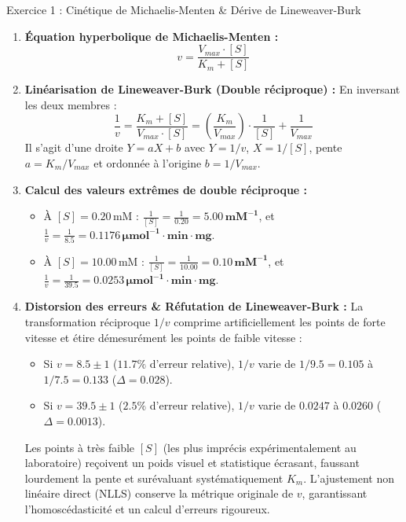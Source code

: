 \documentclass[11pt,a4paper]{article}
\begin{document}

\begin{solutionbox}{Exercice 1 : Cinétique de Michaelis-Menten \& Dérive de Lineweaver-Burk}
\begin{enumerate}[label=\textbf{\alph*.}]
  \item \textbf{Équation hyperbolique de Michaelis-Menten :}
  \begin{equation*}
    v = \frac{V_{max} \cdot [S]}{K_m + [S]}
  \end{equation*}

  \item \textbf{Linéarisation de Lineweaver-Burk (Double réciproque) :}
  En inversant les deux membres :
  \begin{equation*}
    \frac{1}{v} = \frac{K_m + [S]}{V_{max} \cdot [S]} = \left(\frac{K_m}{V_{max}}\right) \cdot \frac{1}{[S]} + \frac{1}{V_{max}}
  \end{equation*}
  Il s'agit d'une droite $Y = a X + b$ avec $Y = 1/v$, $X = 1/[S]$, pente $a = K_m/V_{max}$ et ordonnée à l'origine $b = 1/V_{max}$.

  \item \textbf{Calcul des valeurs extrêmes de double réciproque :}
  \begin{itemize}
    \item À $[S] = 0.20\,\text{mM}$ : $\frac{1}{[S]} = \frac{1}{0.20} = \mathbf{5.00\,\text{mM}^{-1}}$, et $\frac{1}{v} = \frac{1}{8.5} = \mathbf{0.1176\,\mu\text{mol}^{-1}\cdot\text{min}\cdot\text{mg}}$.
    \item À $[S] = 10.00\,\text{mM}$ : $\frac{1}{[S]} = \frac{1}{10.00} = \mathbf{0.10\,\text{mM}^{-1}}$, et $\frac{1}{v} = \frac{1}{39.5} = \mathbf{0.0253\,\mu\text{mol}^{-1}\cdot\text{min}\cdot\text{mg}}$.
  \end{itemize}

  \item \textbf{Distorsion des erreurs \& Réfutation de Lineweaver-Burk :}
  La transformation réciproque $1/v$ comprime artificiellement les points de forte vitesse et étire démesurément les points de faible vitesse :
  \begin{itemize}
    \item Si $v = 8.5 \pm 1$ ($11.7\%$ d'erreur relative), $1/v$ varie de $1/9.5 = 0.105$ à $1/7.5 = 0.133$ ($\Delta = 0.028$).
    \item Si $v = 39.5 \pm 1$ ($2.5\%$ d'erreur relative), $1/v$ varie de $0.0247$ à $0.0260$ ($\Delta = 0.0013$).
  \end{itemize}
  Les points à très faible $[S]$ (les plus imprécis expérimentalement au laboratoire) reçoivent un poids visuel et statistique écrasant, faussant lourdement la pente et surévaluant systématiquement $K_m$. L'ajustement non linéaire direct (NLLS) conserve la métrique originale de $v$, garantissant l'homoscédasticité et un calcul d'erreurs rigoureux.
\end{enumerate}
\end{solutionbox}
\end{document}
